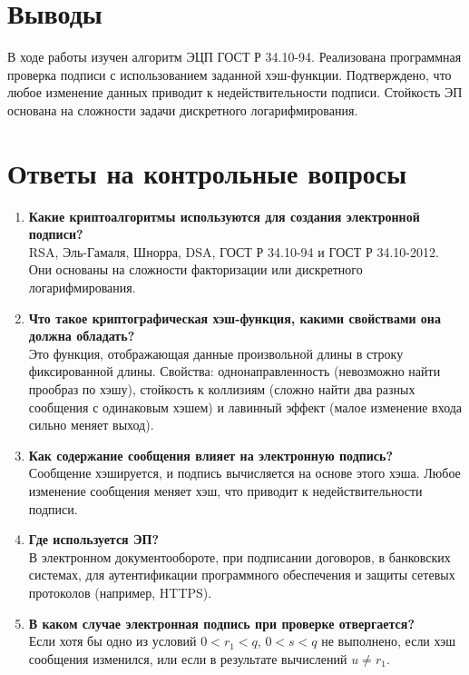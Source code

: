 \documentclass[12pt]{article}
\begin{document}
\section{Выводы}
В ходе работы изучен алгоритм ЭЦП ГОСТ Р 34.10-94. Реализована программная проверка подписи с использованием заданной хэш-функции. Подтверждено, что любое изменение данных приводит к недействительности подписи. Стойкость ЭП основана на сложности задачи дискретного логарифмирования.

\section{Ответы на контрольные вопросы}

\begin{enumerate}
    \item \textbf{Какие криптоалгоритмы используются для создания электронной подписи?} \\
    RSA, Эль-Гамаля, Шнорра, DSA, ГОСТ Р 34.10-94 и ГОСТ Р 34.10-2012. Они основаны на сложности факторизации или дискретного логарифмирования.

    \item \textbf{Что такое криптографическая хэш-функция, какими свойствами она должна обладать?} \\
    Это функция, отображающая данные произвольной длины в строку фиксированной длины. Свойства: однонаправленность (невозможно найти прообраз по хэшу), стойкость к коллизиям (сложно найти два разных сообщения с одинаковым хэшем) и лавинный эффект (малое изменение входа сильно меняет выход).

    \item \textbf{Как содержание сообщения влияет на электронную подпись?} \\
    Сообщение хэшируется, и подпись вычисляется на основе этого хэша. Любое изменение сообщения меняет хэш, что приводит к недействительности подписи.

    \item \textbf{Где используется ЭП?} \\
    В электронном документообороте, при подписании договоров, в банковских системах, для аутентификации программного обеспечения и защиты сетевых протоколов (например, HTTPS).

    \item \textbf{В каком случае электронная подпись при проверке отвергается?} \\
    Если хотя бы одно из условий \(0 < r_1 < q\), \(0 < s < q\) не выполнено, если хэш сообщения изменился, или если в результате вычислений \(u \neq r_1\).


\end{enumerate}
\end{document}
